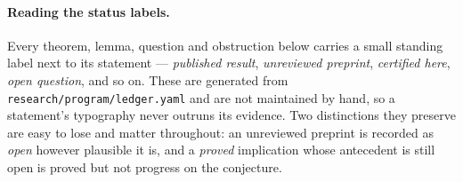 \documentclass[../../main.tex]{subfiles}
\begin{document}
\paragraph{Reading the status labels.}
Every theorem, lemma, question and obstruction below carries a small standing label next to
its statement --- \emph{published result}, \emph{unreviewed preprint}, \emph{certified
here}, \emph{open question}, and so on. These are generated from
\texttt{research/program/ledger.yaml} and are not maintained by hand, so a statement's
typography never outruns its evidence. Two distinctions they preserve are easy to lose and
matter throughout: an unreviewed preprint is recorded as \emph{open} however plausible it
is, and a \emph{proved} implication whose antecedent is still open is proved but not
progress on the conjecture.
\end{document}
